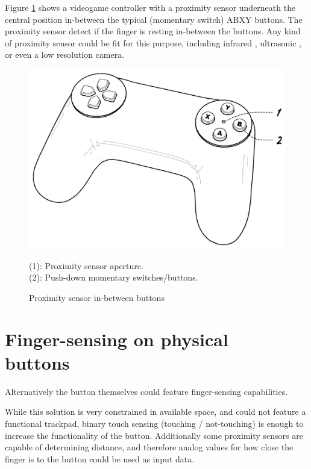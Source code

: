 \documentclass[10pt, twocolumn, a4paper]{article}
\begin{document}
    \pagebreak
    Figure \ref{fig_2} shows a videogame controller with a proximity sensor underneath the central position in-between the typical (momentary switch) ABXY buttons. The proximity sensor detect if the finger is resting in-between the buttons. Any kind of proximity sensor could be fit for this purpose, including infrared \cite{infrared}, ultrasonic \cite{ultrasonic}, or even a low resolution camera.
    \begin{figure}[H]
        \begin{center}
            \includegraphics[width=0.9\linewidth]{figure_A2.png}
            \caption{Proximity sensor in-between buttons\\}
            \label{fig_2}
            \small
                \vspace{2mm}
                (1): Proximity sensor aperture.\\
                (2): Push-down momentary switches/buttons.
        \end{center}
    \end{figure}

\section{Finger-sensing on physical\\buttons}
    Alternatively the button themselves could feature finger-sensing capabilities.

    While this solution is very constrained in available space, and could not feature a functional trackpad, binary touch sensing (touching / not-touching) is enough to increase the functionality of the button. Additionally some proximity sensors are capable of determining distance, and therefore analog values for how close the finger is to the button could be used as input data.
\end{document}
